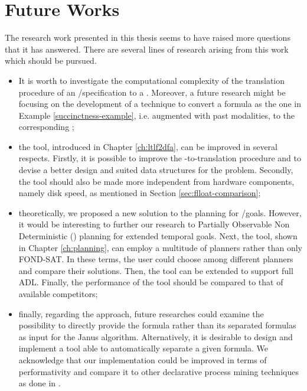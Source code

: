 \section{Future Works}
The research work presented in this thesis seems to have raised more questions that it has answered. There are several lines of research arising from this work which should be pursued.

\begin{itemize}
\item It is worth to investigate the computational complexity of the translation procedure of an \LTLf/\PLTL specification to a \DFA. Moreover, a future research might be focusing on the development of a technique to convert a \LTLp formula as the one in Example \ref{succinctness-example}, i.e. \LTLf augmented with past modalities, to the corresponding \DFA;

\item the \LTLfToDFA tool, introduced in Chapter \ref{ch:ltlf2dfa}, can be improved in several respects. Firstly, it is possible to improve the \LTLf-to-\FOL translation procedure and to devise a better design and suited data structures for the problem. Secondly, the \LTLfToDFA tool should also be made more independent from hardware components, namely disk speed, as mentioned in Section \ref{sec:flloat-comparison};

\item theoretically, we proposed a new solution to the \FOND planning for \LTLf/\PLTL goals. However, it would be interesting to further our research to Partially Observable Non Deterministic (\POND) planning for extended temporal goals. Next, the \FONDFOR tool, shown in Chapter \ref{ch:planning}, can employ a multitude of planners rather than only FOND-SAT. In these terms, the user could choose among different planners and compare their solutions. Then, the \FONDFOR tool can be extended to support full ADL. Finally, the performance of the \FONDFOR tool should be compared to that of available competitors;

\item finally, regarding the \janus approach, future researches could examine the possibility to directly provide the \LTLp formula rather than its separated formulas as input for the Janus algorithm. Alternatively, it is desirable to design and implement a tool able to automatically separate a given \LTLp formula. We acknowledge that our \janus implementation could be improved in terms of performativity and compare it to other declarative process mining techniques as done in \cite{cecconi2018interestingness}.
\end{itemize}








































